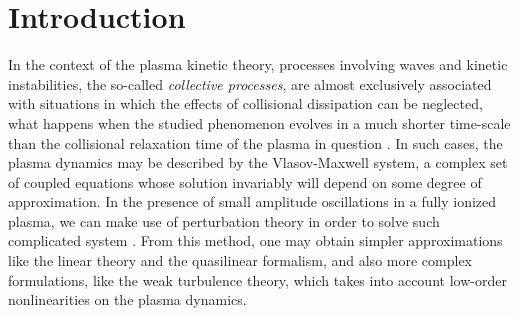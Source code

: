 \documentclass[12pt,a4paper,ruledheader]{report}
\begin{document}
\chapter{Introduction}
\label{cha:intro}
In the context of the plasma kinetic theory, processes
involving waves and kinetic instabilities, the so-called\emph{
  collective processes}, are almost exclusively associated with
situations in which the effects of collisional dissipation can
be neglected, what happens when the studied phenomenon evolves
in a much shorter 
time-scale than the collisional relaxation time
of the plasma in question \cite{akhi1967}. In such cases, the
plasma dynamics may be described by the Vlasov-Maxwell system, 
a complex set of coupled equations whose solution invariably will
depend on some degree of approximation. In the presence of small
amplitude oscillations in a fully ionized plasma, we can make use
of perturbation theory in order to solve such complicated system
\cite{klimo}. From this method, one may obtain simpler approximations
like the linear theory and the quasilinear formalism, and also
more complex formulations, like the weak turbulence theory, which
takes into account low-order nonlinearities on the plasma dynamics.
\end{document}
